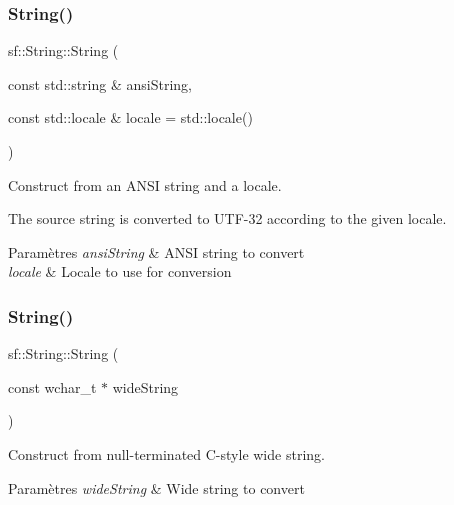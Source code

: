 \subsubsection{\texorpdfstring{String()}{String()}\hspace{0.1cm}{\footnotesize\ttfamily [6/11]}}
{\footnotesize\ttfamily sf\+::\+String\+::\+String (\begin{DoxyParamCaption}\item[{const std\+::string \&}]{ansi\+String,  }\item[{const std\+::locale \&}]{locale = {\ttfamily std\+:\+:locale()} }\end{DoxyParamCaption})}



Construct from an A\+N\+SI string and a locale. 

The source string is converted to U\+T\+F-\/32 according to the given locale.


\begin{DoxyParams}{Paramètres}
{\em ansi\+String} & A\+N\+SI string to convert \\
\hline
{\em locale} & Locale to use for conversion \\
\hline
\end{DoxyParams}
\mbox{\label{classsf_1_1String_a5742d0a9b0c754f711820c2b5c40fa55}} 
\subsubsection{\texorpdfstring{String()}{String()}\hspace{0.1cm}{\footnotesize\ttfamily [7/11]}}
{\footnotesize\ttfamily sf\+::\+String\+::\+String (\begin{DoxyParamCaption}\item[{const wchar\+\_\+t $\ast$}]{wide\+String }\end{DoxyParamCaption})}



Construct from null-\/terminated C-\/style wide string. 


\begin{DoxyParams}{Paramètres}
{\em wide\+String} & Wide string to convert \\
\hline
\end{DoxyParams}
\mbox{\label{classsf_1_1String_a5e38151340af4f9a5f74ad24c0664074}} 
